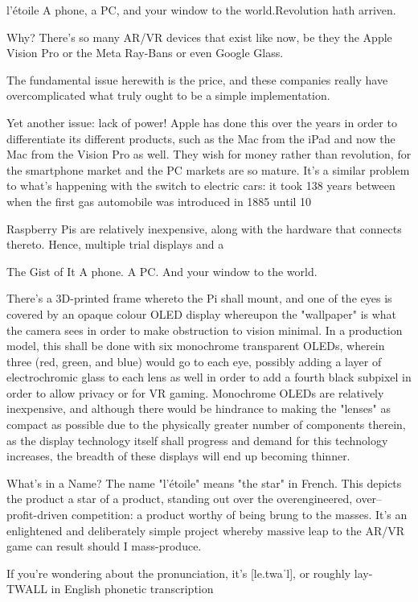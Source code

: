 l'étoile
A phone, a PC, and your window to the world.Revolution hath arriven.

Why?
There's so many AR/VR devices that exist like now, be they the Apple Vision Pro or the Meta Ray-Bans or even Google Glass.

The fundamental issue herewith is the price, and these companies really have overcomplicated what truly ought to be a simple implementation.

Yet another issue: lack of power! Apple has done this over the years in order to differentiate its different products, such as the Mac from the iPad and now the Mac from the Vision Pro as well. They wish for money rather than revolution, for the smartphone market and the PC markets are so mature. It's a similar problem to what's happening with the switch to electric cars: it took 138 years between when the first gas automobile was introduced in 1885 until 10%

Raspberry Pis are relatively inexpensive, along with the hardware that connects thereto. Hence, multiple trial displays and a

The Gist of It
A phone. A PC. And your window to the world.

There's a 3D-printed frame whereto the Pi shall mount, and one of the eyes is covered by an opaque colour OLED display whereupon the "wallpaper" is what the camera sees in order to make obstruction to vision minimal. In a production model, this shall be done with six monochrome transparent OLEDs, wherein three (red, green, and blue) would go to each eye, possibly adding a layer of electrochromic glass to each lens as well in order to add a fourth black subpixel in order to allow privacy or for VR gaming. Monochrome OLEDs are relatively inexpensive, and although there would be hindrance to making the "lenses" as compact as possible due to the physically greater number of components therein, as the display technology itself shall progress and demand for this technology increases, the breadth of these displays will end up becoming thinner.

What's in a Name?
The name "l'étoile" means "the star" in French. This depicts the product a star of a product, standing out over the overengineered, over--profit-driven competition: a product worthy of being brung to the masses. It's an enlightened and deliberately simple project whereby massive leap to the AR/VR game can result should I mass-produce.

If you're wondering about the pronunciation, it's [le.twaˈl], or roughly lay-TWALL in English phonetic transcription

